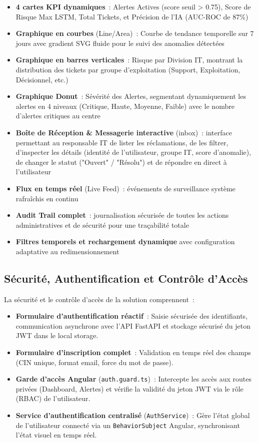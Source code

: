 \documentclass[12pt,a4paper]{report}
\begin{document}
\begin{itemize}[noitemsep]
    \item \textbf{4 cartes KPI dynamiques}~: Alertes Actives (score seuil > 0.75), Score de Risque Max LSTM, Total Tickets, et Précision de l'IA (AUC-ROC de 87\%)
    \item \textbf{Graphique en courbes} (Line/Area)~: Courbe de tendance temporelle sur 7 jours avec gradient SVG fluide pour le suivi des anomalies détectées
    \item \textbf{Graphique en barres verticales}~: Risque par Division IT, montrant la distribution des tickets par groupe d'exploitation (Support, Exploitation, Décisionnel, etc.)
    \item \textbf{Graphique Donut}~: Sévérité des Alertes, segmentant dynamiquement les alertes en 4 niveaux (Critique, Haute, Moyenne, Faible) avec le nombre d'alertes critiques au centre
    \item \textbf{Boîte de Réception \& Messagerie interactive} (inbox)~: interface permettant au responsable IT de lister les réclamations, de les filtrer, d'inspecter les détails (identité de l'utilisateur, groupe IT, score d'anomalie), de changer le statut ("Ouvert" / "Résolu") et de répondre en direct à l'utilisateur
    \item \textbf{Flux en temps réel} (Live Feed)~: événements de surveillance système rafraîchis en continu
    \item \textbf{Audit Trail complet}~: journalisation sécurisée de toutes les actions administratives et de sécurité pour une traçabilité totale
    \item \textbf{Filtres temporels et rechargement dynamique} avec configuration adaptative au redimensionnement
\end{itemize}

\subsection{Sécurité, Authentification et Contrôle d'Accès}

La sécurité et le contrôle d'accès de la solution comprennent~:

\begin{itemize}[noitemsep]
    \item \textbf{Formulaire d'authentification réactif}~: Saisie sécurisée des identifiants, communication asynchrone avec l'API FastAPI et stockage sécurisé du jeton JWT dans le local storage.
    \item \textbf{Formulaire d'inscription complet}~: Validation en temps réel des champs (CIN unique, format email, force du mot de passe).
    \item \textbf{Garde d'accès Angular} (\texttt{auth.guard.ts})~: Intercepte les accès aux routes privées (Dashboard, Alertes) et vérifie la validité du jeton JWT via le rôle (RBAC) de l'utilisateur.
    \item \textbf{Service d'authentification centralisé} (\texttt{AuthService})~: Gère l'état global de l'utilisateur connecté via un \texttt{BehaviorSubject} Angular, synchronisant l'état visuel en temps réel.
\end{itemize}
\end{document}
